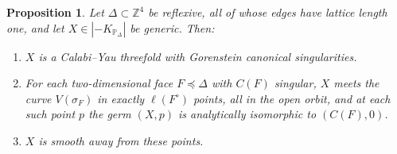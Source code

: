 \documentclass[11pt]{amsart}
\newtheorem{proposition}[theorem]{Proposition}
\theoremstyle{definition}
\theoremstyle{remark}
\newcommand{\ZZ}{\mathbb{Z}}
\newcommand{\PP}{\mathbb{P}}
\begin{document}
\begin{proposition}\label{prop:planting}
Let $\Delta \subset \ZZ^4$ be reflexive, all of whose edges have lattice
length one, and let $X \in |{-K_{\PP_\Delta}}|$ be generic.  Then:
\begin{enumerate}
\item $X$ is a Calabi--Yau threefold with Gorenstein canonical singularities.
\item For each two-dimensional face $F \preceq \Delta$ with $C(F)$ singular,
$X$ meets the curve $V(\sigma_F)$ in exactly $\ell(F^\circ)$ points, all in
the open orbit, and at each such point $p$ the germ $(X,p)$ is analytically
isomorphic to $(C(F), 0)$.
\item $X$ is smooth away from these points.
\end{enumerate}
\end{proposition}
\end{document}
